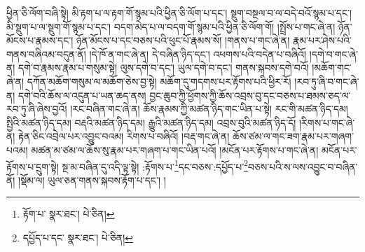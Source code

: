 ཕྱིན་ཅི་ལོག་བཞི་སྟེ། མི་རྟག་པ་ལ་རྟག་གོ་སྙམ་པའི་ཕྱིན་ཅི་ལོག་པ་དང་། སྡུག་བསྔལ་བ་ལ་བདེ་བའོ་སྙམ་པ་དང་། མི་སྡུག་པ་ལ་སྡུག་གོ་སྙམ་པ་དང་། བདག་མེད་པ་ལ་བདག་གོ་སྙམ་པའི་ཕྱིན་ཅི་ལོག་གོ། །སྤྲོས་པ་གང་ཞེ་ན། ཉོན་མོངས་པ་རྣམས་དང་། ཉོན་མོངས་པ་དང་བཅས་པའི་ཕུང་པོ་རྣམས་སོ། །གནས་པ་གང་ཞེ་ན། རྣམ་པར་ཤེས་པའི་གནས་བཞིའམ་བདུན་ནོ། །དེ་ཁོ་ན་གང་ཞེ་ན། དེ་བཞིན་ཉིད་དང་། འཕགས་པའི་བདེན་པ་བཞིའོ། །དགེ་བ་གང་ཞེ་ན། དགེ་བ་རྣམས་རྣམ་པ་གསུམ་སྟེ། ལུས་དགེ་བ་དང་། ཡུལ་དགེ་བ་དང་། གནས་སྐབས་དགེ་བའོ། །མཆོག་གང་ཞེ་ན། དཀོན་མཆོག་གསུམ་ལ་མཆོག་ཅེས་བྱ་སྟེ། མཆོག་དུ་གདགས་པར་རྟོགས་པའི་ཕྱིར་རོ། །རབ་ཏུ་ཞི་བ་གང་ཞེ་ན། དགེ་བའི་ཆོས་ལ་འདུན་པ་ཡན་ཆད་ནས། བྱང་ཆུབ་ཀྱི་ཕྱོགས་ཀྱི་ཆོས་འབྲས་བུ་དང་བཅས་པ་ཐམས་ཅད་ལ་རབ་ཏུ་ཞི་ཞེས་བྱའོ། །རང་བཞིན་གང་ཞེ་ན། ཆོས་རྣམས་ཀྱི་མཚན་ཉིད་གང་ཡིན་པ་སྟེ། རང་གི་མཚན་ཉིད་དམ། སྤྱིའི་མཚན་ཉིད་དམ། བརྡའི་མཚན་ཉིད་དམ། རྒྱུའི་མཚན་ཉིད་དམ། འབྲས་བུའི་མཚན་ཉིད་དོ། །རིགས་པ་གང་ཞེ་ན། རྟེན་ཅིང་འབྲེལ་པར་འབྱུང་བའམ། རིགས་པ་བཞིའོ། །བརྡ་གང་ཞེ་ན། ཆོས་ཙམ་ལ་གང་ཟག་རྣམ་པར་གཞག་པའམ། མཚན་མ་ཙམ་ལ་ཆོས་སུ་རྣམ་པར་གཞག་པ་གང་ཡིན་པའོ། །མངོན་པར་རྟོགས་པ་གང་ཞེ་ན། མངོན་པར་རྟོགས་པ་དྲུག་སྟེ། སྔ་མ་བཞིན་དུ་འདི་ལྟ་སྟེ། :རྟོགས་པ་\footnote{རྟོག་པ་  སྣར་ཐང་།  པེ་ཅིན། }དང་བཅས་:དཔྱོད་པ་\footnote{དཔྱོད་པ་དང་  སྣར་ཐང་།  པེ་ཅིན། }བཅས་པའི་ས་ལས་འབྱུང་བ་བཞིན་ནོ། །སྡོམ་ལ། ཡུལ་ཅན་གནས་སྐབས་རྟོག་པ་དང་། །
